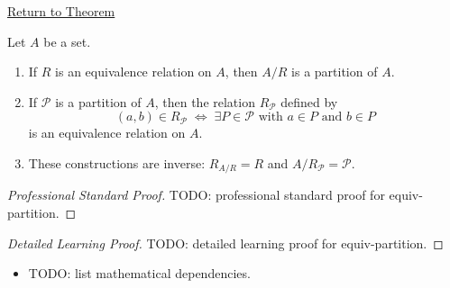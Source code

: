 \newpage
{}
\label{prf:equiv-partition}

\begin{remark*}[Return]
\hyperref[thm:equiv-partition]{Return to Theorem}
\end{remark*}

\begin{theorem*}
Let $A$ be a set.
\begin{enumerate}[label=(\roman*)]
\item If $R$ is an equivalence relation on $A$, then $A/R$ is a partition of $A$.
\item If $\mathcal{P}$ is a partition of $A$, then the relation
$R_{\mathcal{P}}$ defined by
\[
(a,b) \in R_{\mathcal{P}} \;\Longleftrightarrow\;
\exists P \in \mathcal{P} \text{ with } a \in P \text{ and } b \in P
\]
is an equivalence relation on $A$.
\item These constructions are inverse: $R_{A/R} = R$ and $A/R_{\mathcal{P}} = \mathcal{P}$.
\end{enumerate}
\end{theorem*}

\begin{proof}[Professional Standard Proof]
\LRAProofBodyStart
TODO: professional standard proof for equiv-partition.
\end{proof}

\begin{proof}[Detailed Learning Proof]
\LRAProofBodyStart
TODO: detailed learning proof for equiv-partition.
\end{proof}

\begin{remark*}
\end{remark*}

\begin{dependencies}
\begin{itemize}
  \item TODO: list mathematical dependencies.
\end{itemize}
\end{dependencies}

\clearpage
